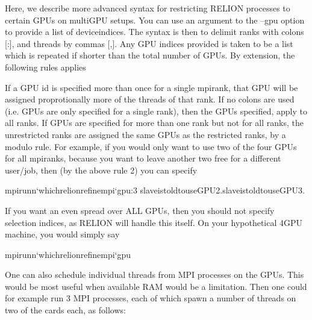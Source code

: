 \documentclass[a4paper,11pt,english]{sphinxmanual}
\begin{document}
\sphinxAtStartPar
Here, we describe more advanced syntax for restricting RELION processes to certain GPUs on multi\sphinxhyphen{}GPU setups. You can use an argument to the –gpu option to provide a list of device\sphinxhyphen{}indices. The syntax is then to delimit ranks with colons {[}:{]}, and threads by commas {[},{]}. Any GPU indices provided is taken to be a list which is repeated if shorter than the total number of GPUs. By extension, the following rules applies

\sphinxAtStartPar
If a GPU id is specified more than once for a single mpi\sphinxhyphen{}rank, that GPU will be assigned proprotionally more of the threads of that rank.
If no colons are used (i.e. GPUs are only specified for a single rank), then the GPUs specified, apply to all ranks.
If GPUs are specified for more than one rank but not for all ranks, the unrestricted ranks are assigned the same GPUs as the restricted ranks, by a modulo rule.
For example, if you would only want to use two of the four GPUs for all mpi\sphinxhyphen{}ranks, because you want to leave another two free for a different user/job, then (by the above rule 2) you can specify

\begin{sphinxVerbatim}[commandchars=\\\{\}]
mpirun\PYGZhy{}n‘whichrelion\PYGZus{}refine\PYGZus{}mpi‘\PYGZhy{}\PYGZhy{}gpu:3
slaveistoldtouseGPU2.slaveistoldtouseGPU3.
\end{sphinxVerbatim}

\sphinxAtStartPar
If you want an even spread over ALL GPUs, then you should not specify selection indices, as RELION will handle this itself. On your hypothetical 4\sphinxhyphen{}GPU machine, you would simply say

\begin{sphinxVerbatim}[commandchars=\\\{\}]
mpirun\PYGZhy{}n‘whichrelion\PYGZus{}refine\PYGZus{}mpi‘\PYGZhy{}\PYGZhy{}gpu
\end{sphinxVerbatim}

\sphinxAtStartPar
One can also schedule individual threads from MPI processes on the GPUs. This would be most useful when available RAM would be a limitation. Then one could for example run 3 MPI processes, each of which spawn a number of threads on two of the cards each, as follows:
\end{document}
